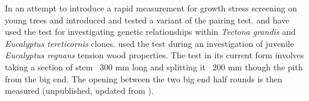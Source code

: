 In an attempt to introduce a rapid measurement for growth stress screening on young trees \cite{Chauhan_2010} and \cite{Entwistle_2014} introduced and tested a variant of the pairing test. \cite{naranjo2012early} and \cite{Aggarwal_2013} have used the test for investigating genetic relationships within \textit{Tectona grandis} and \textit{Eucalyptus tereticornis} clones. \cite{Chauhan_2011} used the test during an investigation of juvenile \textit{Eucalyptus regnans} tension wood properties. The test in its current form involves taking a section of stem ~300 mm long and splitting it ~200 mm though the pith from the big end. The opening between the two big end half rounds is then measured (unpublished, updated from \cite{Chauhan_2011}).  